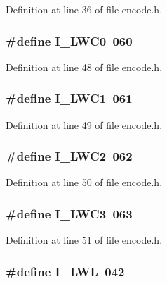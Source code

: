 Definition at line 36 of file encode.\+h.

\subsubsection[{I\+\_\+\+L\+W\+C0}]{\setlength{\rightskip}{0pt plus 5cm}\#define I\+\_\+\+L\+W\+C0~060}\label{encode_8h_a997fa4b5bc72f0a8acc60eb37f80cbce}


Definition at line 48 of file encode.\+h.

\subsubsection[{I\+\_\+\+L\+W\+C1}]{\setlength{\rightskip}{0pt plus 5cm}\#define I\+\_\+\+L\+W\+C1~061}\label{encode_8h_aac27ccc41df3f6a1bcec72a6a0f8cd2d}


Definition at line 49 of file encode.\+h.

\subsubsection[{I\+\_\+\+L\+W\+C2}]{\setlength{\rightskip}{0pt plus 5cm}\#define I\+\_\+\+L\+W\+C2~062}\label{encode_8h_aee5facb491b15a84257dd661d03b2d7a}


Definition at line 50 of file encode.\+h.

\subsubsection[{I\+\_\+\+L\+W\+C3}]{\setlength{\rightskip}{0pt plus 5cm}\#define I\+\_\+\+L\+W\+C3~063}\label{encode_8h_a65b58cfeba6593426d1498e6a595b6e1}


Definition at line 51 of file encode.\+h.

\subsubsection[{I\+\_\+\+L\+WL}]{\setlength{\rightskip}{0pt plus 5cm}\#define I\+\_\+\+L\+WL~042}\label{encode_8h_a4cc81f83eae509717e3c0266208e562f}


